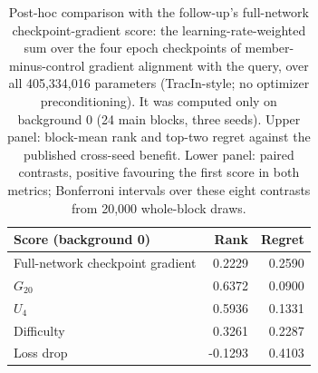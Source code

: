 \begin{table}[tp]
\centering
\small
\begin{tabular}{@{}lrr@{}}
\toprule
Score (background 0) & Rank & Regret \\
\midrule
Full-network checkpoint gradient & 0.2229 & 0.2590 \\
$G_{20}$ & 0.6372 & 0.0900 \\
$U_4$ & 0.5936 & 0.1331 \\
Difficulty & 0.3261 & 0.2287 \\
Loss drop & -0.1293 & 0.4103 \\
\bottomrule
\end{tabular}

\vspace{0.6em}
\caption{Post-hoc comparison with the follow-up's full-network checkpoint-gradient score: the
learning-rate-weighted sum over the four epoch checkpoints of member-minus-control gradient alignment with the
query, over all 405,334,016 parameters (TracIn-style; no optimizer preconditioning). It was computed only on
background 0 (24 main blocks, three seeds). Upper panel: block-mean rank and top-two regret against the
published cross-seed benefit. Lower panel: paired contrasts, positive favouring the first score in both
metrics; Bonferroni intervals over these eight contrasts from 20,000 whole-block draws.}
\label{tab:panel_gradient}
\end{table}
